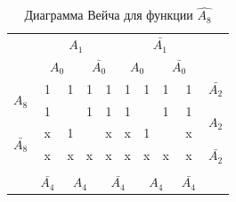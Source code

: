 \documentclass[a4paper,14pt]{article}
\begin{document}
\begin{table}[H]
	\begin{minipage}{.5\linewidth}
		\caption{Диаграмма Вейча для функции $\hat{A_8}$}
		\centering
		\begin{tabular}{cccccccccc}
			& \multicolumn{4}{c}{$A_1$}                                                                           & \multicolumn{4}{c}{$\bar{A_1}$}                                                                    &                      \\
			& \multicolumn{2}{c}{$A_0$}                         & \multicolumn{2}{c}{$\bar{A_0}$}                   & \multicolumn{2}{c}{$A_0$}                         & \multicolumn{2}{c}{$\bar{A_0}$}                   &                      \\ \cline{2-9}
			\multicolumn{1}{c|}{\multirow{2}{*}{$A_8$}}       & \multicolumn{1}{c|}{1} & \multicolumn{1}{c|}{1} & \multicolumn{1}{c|}{1} & \multicolumn{1}{c|}{1} & \multicolumn{1}{c|}{1} & \multicolumn{1}{c|}{1} & \multicolumn{1}{c|}{1} & \multicolumn{1}{c|}{1} & $\bar{A_2}$            \\ \cline{2-9}
			\multicolumn{1}{c|}{}                           & \multicolumn{1}{c|}{1} & \multicolumn{1}{c|}{}  & \multicolumn{1}{c|}{1} & \multicolumn{1}{c|}{1} & \multicolumn{1}{c|}{1} & \multicolumn{1}{c|}{}  & \multicolumn{1}{c|}{1} & \multicolumn{1}{c|}{1} & \multirow{2}{*}{$A_2$} \\ \cline{2-9}
			\multicolumn{1}{c|}{\multirow{2}{*}{$\bar{A_8}$}} & \multicolumn{1}{c|}{x} & \multicolumn{1}{c|}{1} & \multicolumn{1}{c|}{}  & \multicolumn{1}{c|}{x} & \multicolumn{1}{c|}{x} & \multicolumn{1}{c|}{1} & \multicolumn{1}{c|}{}  & \multicolumn{1}{c|}{x} &                      \\ \cline{2-9}
			\multicolumn{1}{c|}{}                           & \multicolumn{1}{c|}{x} & \multicolumn{1}{c|}{x} & \multicolumn{1}{c|}{x} & \multicolumn{1}{c|}{x} & \multicolumn{1}{c|}{x} & \multicolumn{1}{c|}{x} & \multicolumn{1}{c|}{x} & \multicolumn{1}{c|}{x} & $\bar{A_2}$            \\ \cline{2-9}
			\\
			& $\bar{A_4}$              & \multicolumn{2}{c}{$A_4$}                         & \multicolumn{2}{c}{$\bar{A_4}$}                   & \multicolumn{2}{c}{$A_4$}                         & $\bar{A_4}$              &                     
		\end{tabular}
	\end{minipage}%
	\begin{minipage}{.5\linewidth}

\end{minipage}
\end{table}
\end{document}
